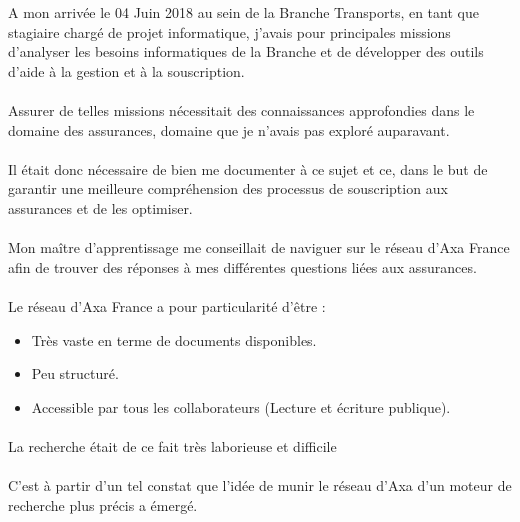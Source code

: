 \documentclass[12pt, a4paper, oneside]{book}
\begin{document}
A mon arrivée le 04 Juin 2018 au sein de la Branche Transports, en tant que stagiaire chargé de projet informatique, j'avais pour principales missions d'analyser les besoins informatiques de la Branche et de développer des outils d'aide à la gestion et à la souscription.


\paragraph{}

Assurer de telles missions nécessitait des connaissances approfondies dans le domaine des assurances, domaine que je n'avais pas exploré auparavant.

\paragraph{}
Il était donc nécessaire de bien me documenter à ce sujet et ce, dans le but de garantir une meilleure compréhension des processus de souscription aux assurances et de les optimiser.

\paragraph{}

Mon maître d'apprentissage me conseillait de naviguer sur le réseau d'Axa France afin de trouver des réponses à mes différentes questions liées aux assurances. 
 
\paragraph{}

Le réseau d'Axa France a pour particularité d'être : 

\begin{itemize}
\item Très vaste en terme de documents disponibles.
\item Peu structuré.
\item Accessible par tous les collaborateurs (Lecture et écriture publique).
\end{itemize}

 
\paragraph{}
La recherche était de ce fait très laborieuse et difficile
\paragraph{}
C'est à partir d'un tel constat que l'idée de munir le réseau d'Axa d'un moteur de recherche plus précis a émergé.
\end{document}
